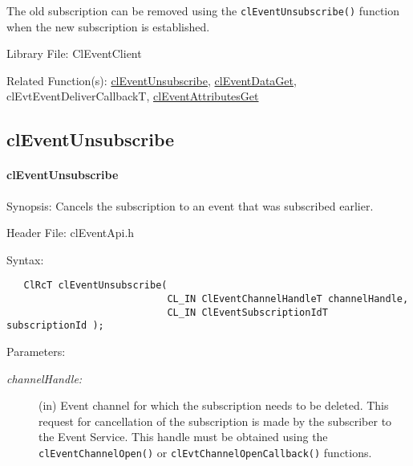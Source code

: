 \begin{flushleft}
\begin{Desc}
The old subscription can be removed using the {\tt{clEventUnsubscribe()}} function when the new subscription is established.
 \end{Desc}
\begin{Desc}
\item[Library File:]Cl\-Event\-Client\end{Desc}
\begin{Desc}
\item[Related Function(s):]\hyperlink{pageem115}{cl\-Event\-Unsubscribe}, \hyperlink{pageem111}{cl\-Event\-Data\-Get},
cl\-Evt\-Event\-Deliver\-Callback\-T, \hyperlink{pageem110}{cl\-Event\-Attributes\-Get} \end{Desc}
\newpage


\subsection{clEventUnsubscribe}
\hypertarget{pageem115}{}\paragraph{cl\-Event\-Unsubscribe}\label{pageem115}
\begin{Desc}
\item[Synopsis:]Cancels the subscription to an event that was subscribed earlier.\end{Desc}
\begin{Desc}
\item[Header File:]clEventApi.h\end{Desc}
\begin{Desc}
\item[Syntax:]

\footnotesize\begin{verbatim}   ClRcT clEventUnsubscribe(
              				CL_IN ClEventChannelHandleT channelHandle,
              				CL_IN ClEventSubscriptionIdT subscriptionId );
\end{verbatim}
\normalsize
\end{Desc}
\begin{Desc}
\item[Parameters:]
\begin{description}
\item[{\em channel\-Handle:}](in) Event channel for which the subscription needs to be deleted. This request for cancellation of the subscription is made 
by the subscriber to the Event Service. This handle must be obtained using the {\tt{clEventChannelOpen()}} or 
{\tt{cl\-Evt\-Channel\-Open\-Callback()}} functions.


\end{description}
\end{Desc}
\end{flushleft}
